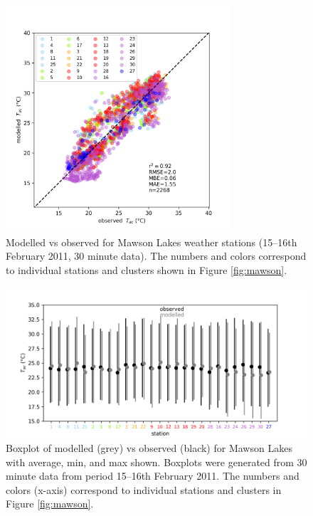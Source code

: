 \documentclass[final,3p,times,authoryear]{elsarticle}
\begin{document}
\begin{figure}[!htbp]
\begin{center}

\includegraphics[width=0.75\textwidth,keepaspectratio]{figure7.png}
 \caption{Modelled  vs observed  for Mawson Lakes weather stations (15--16th February 2011, 30 minute data). The  numbers and colors correspond to individual stations and clusters shown in Figure \ref{fig:mawson}. } \label{fig:MawsonModObs}
\end{center}
\end{figure}

\begin{figure}[!htbp]
\includegraphics[width=1.0\textwidth,keepaspectratio]{figure8.png}
 \caption{Boxplot of modelled  (grey) vs observed  (black) for Mawson Lakes with average, min, and max  shown. Boxplots were generated from 30 minute data from period 15--16th February 2011.  The  numbers and colors (x-axis) correspond to individual stations and clusters in Figure \ref{fig:mawson}.} \label{fig:MawsonBox}


\end{figure}
\end{document}
